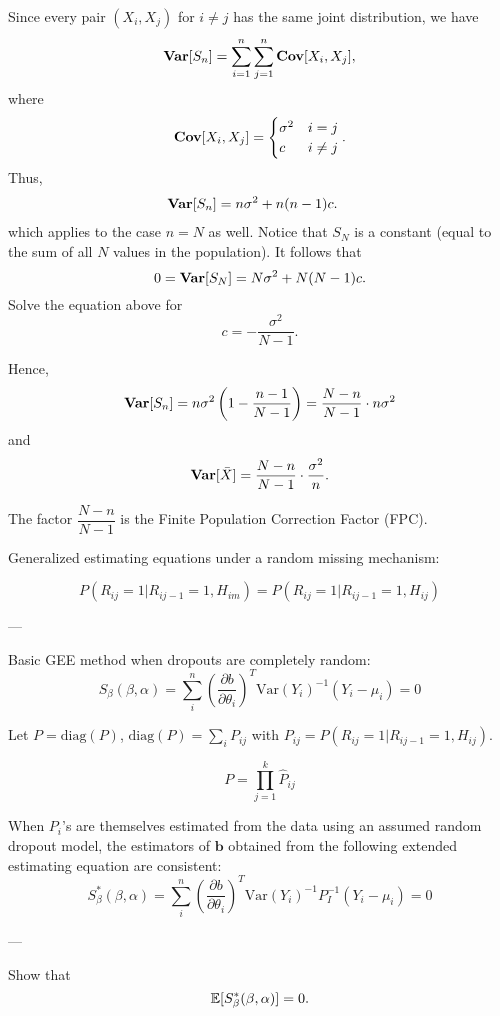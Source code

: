 \documentclass[UTF8,a4paper,10pt]{article}
\begin{document}
Since every pair $(X_i, X_j)$ for $i \neq j$ has the same joint distribution, we have
\begin{align*}
    \operatorname{\textbf{Var}}[S_n] = \sum_{i=1}^{n}\sum_{j=1}^{n}\operatorname{\textbf{Cov}}[X_i,X_j],
\end{align*}
where 
\[\operatorname{\textbf{Cov}}[X_i,X_j] = \begin{cases}
     \sigma^2 & i=j\\
    c  & i\neq j\\
\end{cases}.\]
Thus,
\begin{align*}
    \operatorname{\textbf{Var}}[S_n] 
    &= n\sigma^2 + n(n-1)c.\label{eq.01}
\end{align*}
which applies to the case $n=N$ as well. Notice that $S_N$ is a constant (equal to the sum of all $N$ values in the population). It follows that
\[
0 = \operatorname{\textbf{Var}}[S_N] = N\sigma^2 + N(N-1)c.
\]
Solve the equation above for $$c = -\frac{\sigma^2}{N-1}.$$

Hence,
\[
\operatorname{\textbf{Var}}[S_n] = n\sigma^2\left(1 - \frac{n-1}{N-1}\right) = \frac{N-n}{N-1} \cdot n\sigma^2
\]
and
\[
\operatorname{\textbf{Var}}[\bar{X}] = \frac{N-n}{N-1} \cdot \frac{\sigma^2}{n}.
\]

The factor \(\dfrac{N-n}{N-1}\) is the Finite Population Correction Factor (FPC).

\pagebreak

\begin{Problem}[]{Generalized estimating equations under a random missing mechanism:}

\[
P(R_{ij}=1|R_{ij-1}=1, H_{im}) = P(R_{ij}=1|R_{ij-1}=1, H_{ij})
\]

---

Basic GEE method when dropouts are completely random:
\[
S_{\beta}(\beta,\alpha) = \sum_{i}^n \left(\frac{\partial b}{\partial \theta_i}\right)^T \text{Var}(Y_i)^{-1}(Y_i - \mu_i) = 0
\]


Let $P=\text{diag}(P)$, $\text{diag}(P)=\sum_{i} P_{ij}$ with $P_{ij}=P(R_{ij}=1|R_{ij-1}=1,H_{ij})$.

\[
P = \prod_{j=1}^{k} \hat{P}_{ij}
\]

When $P_i$'s are themselves estimated from the data using an assumed random dropout model, the estimators of $\mathbf{b}$ obtained from the following extended estimating equation are consistent:
\[
S_{\beta}^*(\beta,\alpha) = \sum_{i}^n \left(\frac{\partial b}{\partial \theta_i}\right)^T \text{Var}(Y_i)^{-1}P_I^{-1}(Y_i - \mu_i) = 0
\]

---

Show that 
\[\operatorname{\mathbb{E}}[S_{\beta}^*(\beta,\alpha)]=0.\]
\end{Problem}
\end{document}
